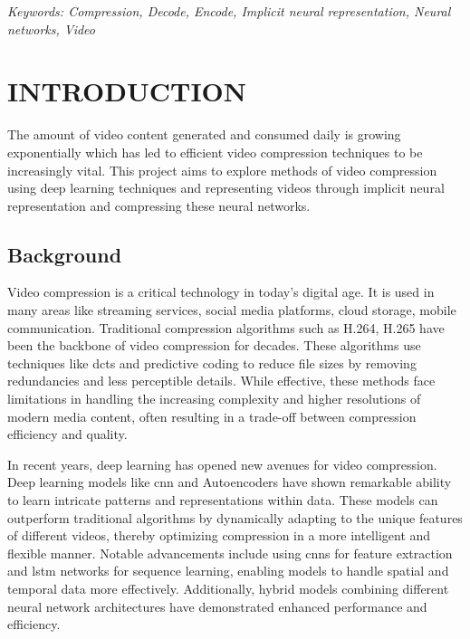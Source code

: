 \documentclass{ioereport}
\begin{document}
    \textit{Keywords: Compression, Decode, Encode, Implicit neural representation, Neural networks, Video}

    \pagebreak
    
    \tableofcontents
    \pagebreak
    
    \listoffigures
    \pagebreak
    
    \listoftables
    \pagebreak

    \doublespacing
    \printglossary[type=\acronymtype,style=acronyms-only,title=List of Abbreviations{\vspace{0.15\baselineskip}}]
    \onehalfspacing


\mainsection
\section{\MakeUppercase{Introduction}}
The amount of video content generated and consumed daily is growing exponentially \cite{biteable2021} which has led to efficient video compression techniques to be increasingly vital. This project aims to explore methods of video compression using deep learning techniques and representing videos through implicit neural representation and compressing these neural networks.
    
    \subsection{Background}
    Video compression is a critical technology in today’s digital age. It is used in many areas like streaming services, social media platforms, cloud storage, mobile communication. Traditional compression algorithms such as H.264, H.265 have been the backbone of video compression for decades. These algorithms use techniques like \gls{dct}s and predictive coding to reduce file sizes by removing redundancies and less perceptible details. While effective, these methods face limitations in handling the increasing complexity and higher resolutions of modern media content, often resulting in a trade-off between compression efficiency and quality.

    In recent years, deep learning has opened new avenues for video compression. Deep learning models like \gls{cnn} and Autoencoders have shown remarkable ability to learn intricate patterns and representations within data. These models can outperform traditional algorithms by dynamically adapting to the unique features of different videos, thereby optimizing compression in a more intelligent and flexible manner. Notable advancements include using \gls{cnn}s for feature extraction and \gls{lstm} networks for sequence learning, enabling models to handle spatial and temporal data more effectively. Additionally, hybrid models combining different neural network architectures have demonstrated enhanced performance and efficiency. 
    
\end{document}
